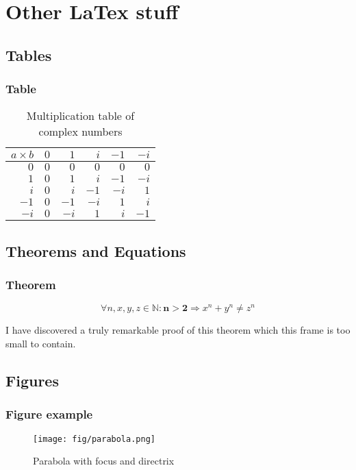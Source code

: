 \documentclass[aspectratio=169]{beamer}
\begin{document}
\section{Other LaTex stuff}

\subsection{Tables}


\begin{frame}
\frametitle{Table}


\begin{table}
\caption{Multiplication table of complex numbers}
\begin{tabular}{r | r r r r r}
$a \times b$ & $0$ &  $1$ &  $i$ & $-1$ & $-i$ \\ \hline
         $0$ & $0$ &  $0$ &  $0$ &  $0$ &  $0$ \\
         $1$ & $0$ &  $1$ &  $i$ & $-1$ & $-i$ \\
         $i$ & $0$ &  $i$ & $-1$ & $-i$ &  $1$ \\
        $-1$ & $0$ & $-1$ & $-i$ &  $1$ &  $i$ \\
        $-i$ & $0$ & $-i$ &  $1$ &  $i$ & $-1$ \\
\end{tabular}
\end{table}
\end{frame}


\subsection{Theorems and Equations}


\begin{frame}
\frametitle{Theorem}
\begin{theorem}
\begin{equation}
    \forall n, x, y, z \in \mathbb{N}: \mathbf{n > 2} \Rightarrow x^n + y^n \neq z^n
\end{equation}
\end{theorem}
I have discovered a truly remarkable proof of this theorem which this frame is too small to contain.
\end{frame}


\subsection{Figures}


\begin{frame}
\frametitle{Figure example}
\begin{figure}
    \texttt{[image: fig/parabola.png]}
    \caption{Parabola with focus and directrix}
\end{figure}
\end{frame}


\end{document}
